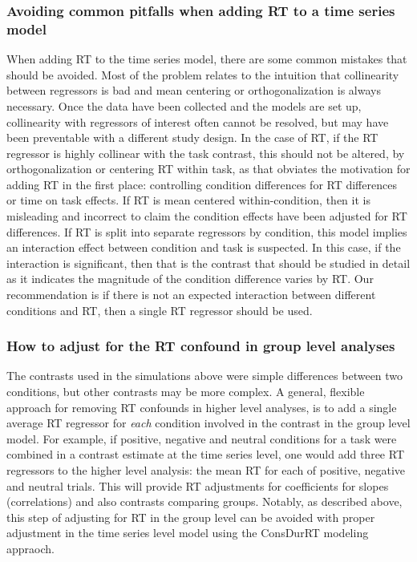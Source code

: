 \documentclass[titlepage,12pt] {article}
\begin{document}
\subsubsection*{Avoiding common pitfalls when adding RT to a time series model}
When adding RT to the time series model, there are some  common mistakes that should be avoided.  Most of the problem relates to the intuition that collinearity between regressors is bad and mean centering or orthogonalization is always necessary.  Once the data have been collected and the models are set up, collinearity with regressors of interest often cannot be resolved, but may have been preventable with a different study design.  In the case of RT, if the RT regressor is highly collinear with the task contrast, this should not be altered, by orthogonalization or centering RT within task, as that obviates the motivation for adding RT in the first place: controlling condition differences for RT differences or time on task effects.  If RT is mean centered within-condition, then it is misleading and incorrect to claim the condition effects have been adjusted for RT differences.  If RT is split into separate regressors by condition, this model implies an interaction effect between condition and task is suspected.  In this case, if the interaction is significant, then that is the contrast that should be studied in detail as it indicates the magnitude of the condition difference varies by  RT.  Our recommendation is if there is not an expected interaction between different conditions and RT, then a single RT regressor should be used.  


\subsubsection*{How to adjust for the RT confound in group level analyses}

The contrasts used in the simulations above were simple differences between two conditions, but other contrasts may be more complex.  A general, flexible approach for removing RT confounds in higher level analyses, is to  add a single average RT regressor for \emph{each} condition involved in the contrast in the group level model.  For example, if positive, negative and neutral conditions for a task were combined in a contrast estimate at the time series level, one would add three RT regressors to the higher level analysis: the mean RT for each of positive, negative and neutral trials.  This will provide RT adjustments for coefficients for slopes (correlations) and also contrasts comparing groups.  Notably, as described above, this step of adjusting for RT in the group level can be avoided with proper adjustment in the time series level model using the ConsDurRT modeling appraoch.
\end{document}
